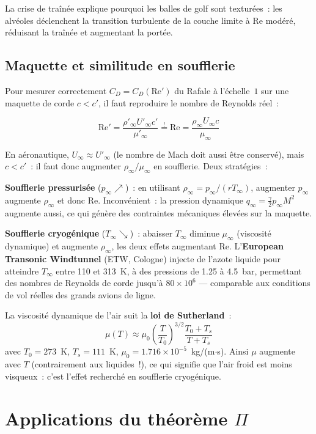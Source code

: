 \documentclass[11pt,a4paper]{report}
\begin{document}
La crise de traînée explique pourquoi les balles de golf sont texturées~:
les alvéoles déclenchent la transition turbulente de la couche limite à
$\mathrm{Re}$ modéré, réduisant la traînée et augmentant la portée.

\subsection{Maquette et similitude en soufflerie}

Pour mesurer correctement $C_D = C_D(\mathrm{Re}')$ du Rafale à l'échelle~$1$
sur une maquette de corde $c < c'$, il faut reproduire le nombre de Reynolds
réel~:

\[
    \mathrm{Re}' = \frac{\rho'_\infty U'_\infty c'}{\mu'_\infty}
    \overset{!}{=}
    \mathrm{Re} = \frac{\rho_\infty U_\infty c}{\mu_\infty}
\]

En aéronautique, $U_\infty \approx U'_\infty$ (le nombre de Mach doit aussi être
conservé), mais $c < c'$~: il faut donc augmenter $\rho_\infty/\mu_\infty$ en
soufflerie. Deux stratégies~:

\medskip
\noindent \textbf{Soufflerie pressurisée} ($p_\infty \nearrow$)~: en utilisant
$\rho_\infty = p_\infty/(rT_\infty)$, augmenter $p_\infty$ augmente $\rho_\infty$
et donc Re. Inconvénient~: la pression dynamique $q_\infty = \frac{\gamma}{2}p_\infty M^2$
augmente aussi, ce qui génère des contraintes mécaniques élevées sur la maquette.

\medskip
\noindent \textbf{Soufflerie cryogénique} ($T_\infty \searrow$)~: abaisser $T_\infty$
diminue $\mu_\infty$ (viscosité dynamique) et augmente $\rho_\infty$, les deux
effets augmentant Re. L'\textbf{European Transonic Windtunnel} (ETW, Cologne)
injecte de l'azote liquide pour atteindre $T_\infty$ entre 110 et 313~K, à des
pressions de 1.25 à 4.5~bar, permettant des nombres de Reynolds de corde
jusqu'à $80\times10^6$ --- comparable aux conditions de vol réelles des
grands avions de ligne.

\medskip
La viscosité dynamique de l'air suit la \textbf{loi de Sutherland}~:
\[
    \mu(T) \approx \mu_0\left(\frac{T}{T_0}\right)^{3/2}\frac{T_0+T_s}{T+T_s}
\]
avec $T_0=273$~K, $T_s=111$~K, $\mu_0=1.716\times10^{-5}$~kg/(m$\cdot$s).
Ainsi $\mu$ augmente avec $T$ (contrairement aux liquides~!), ce qui signifie
que l'air froid est moins visqueux~: c'est l'effet recherché en soufflerie
cryogénique.

\section{Applications du théorème $\Pi$}
\end{document}
